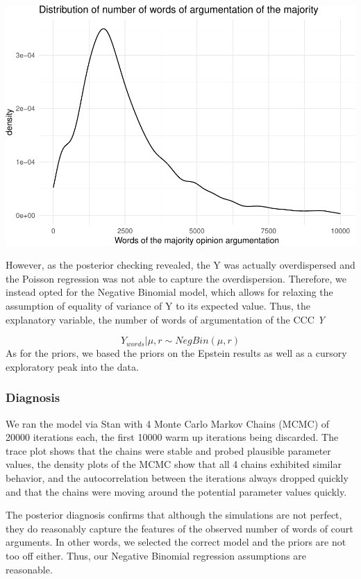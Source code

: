 \documentclass[
  11pt,
]{article}
\begin{document}
\includegraphics{dissents_article_files/figure-latex/negbinom-1.pdf}

However, as the posterior checking revealed, the Y was actually
overdispersed and the Poisson regression was not able to capture the
overdispersion. Therefore, we instead opted for the Negative Binomial
model, which allows for relaxing the assumption of equality of variance
of Y to its expected value. Thus, the explanatory variable, the number
of words of argumentation of the CCC \emph{Y}

\[
Y_{words} | \mu, r \sim NegBin(\mu, r)
\] As for the priors, we based the priors on the Epstein results as well
as a cursory exploratory peak into the data.

\hypertarget{diagnosis}{%
\subsubsection{Diagnosis}\label{diagnosis}}

We ran the model via Stan with 4 Monte Carlo Markov Chains (MCMC) of
20000 iterations each, the first 10000 warm up iterations being
discarded. The trace plot shows that the chains were stable and probed
plausible parameter values, the density plots of the MCMC show that all
4 chains exhibited similar behavior, and the autocorrelation between the
iterations always dropped quickly and that the chains were moving around
the potential parameter values quickly.

The posterior diagnosis confirms that although the simulations are not
perfect, they do reasonably capture the features of the observed number
of words of court arguments. In other words, we selected the correct
model and the priors are not too off either. Thus, our Negative Binomial
regression assumptions are reasonable.
\end{document}
